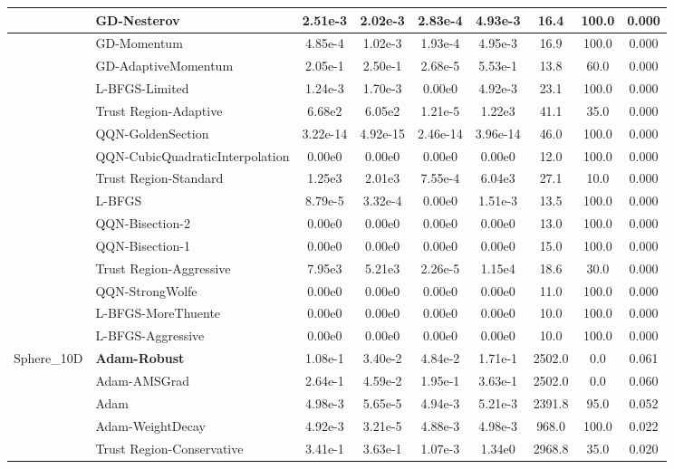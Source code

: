 \documentclass{article}
\begin{document}
\begin{longtable}{|l|l|c|c|c|c|c|c|c|}
\hline
 & GD-Nesterov & 2.51e-3 & 2.02e-3 & 2.83e-4 & 4.93e-3 & 16.4 & 100.0 & 0.000 \\
\hline
 & GD-Momentum & 4.85e-4 & 1.02e-3 & 1.93e-4 & 4.95e-3 & 16.9 & 100.0 & 0.000 \\
\hline
 & GD-AdaptiveMomentum & 2.05e-1 & 2.50e-1 & 2.68e-5 & 5.53e-1 & 13.8 & 60.0 & 0.000 \\
\hline
 & L-BFGS-Limited & 1.24e-3 & 1.70e-3 & 0.00e0 & 4.92e-3 & 23.1 & 100.0 & 0.000 \\
\hline
 & Trust Region-Adaptive & 6.68e2 & 6.05e2 & 1.21e-5 & 1.22e3 & 41.1 & 35.0 & 0.000 \\
\hline
 & QQN-GoldenSection & 3.22e-14 & 4.92e-15 & 2.46e-14 & 3.96e-14 & 46.0 & 100.0 & 0.000 \\
\hline
 & QQN-CubicQuadraticInterpolation & 0.00e0 & 0.00e0 & 0.00e0 & 0.00e0 & 12.0 & 100.0 & 0.000 \\
\hline
 & Trust Region-Standard & 1.25e3 & 2.01e3 & 7.55e-4 & 6.04e3 & 27.1 & 10.0 & 0.000 \\
\hline
 & L-BFGS & 8.79e-5 & 3.32e-4 & 0.00e0 & 1.51e-3 & 13.5 & 100.0 & 0.000 \\
\hline
 & QQN-Bisection-2 & 0.00e0 & 0.00e0 & 0.00e0 & 0.00e0 & 13.0 & 100.0 & 0.000 \\
\hline
 & QQN-Bisection-1 & 0.00e0 & 0.00e0 & 0.00e0 & 0.00e0 & 15.0 & 100.0 & 0.000 \\
\hline
 & Trust Region-Aggressive & 7.95e3 & 5.21e3 & 2.26e-5 & 1.15e4 & 18.6 & 30.0 & 0.000 \\
\hline
 & QQN-StrongWolfe & 0.00e0 & 0.00e0 & 0.00e0 & 0.00e0 & 11.0 & 100.0 & 0.000 \\
\hline
 & L-BFGS-MoreThuente & 0.00e0 & 0.00e0 & 0.00e0 & 0.00e0 & 10.0 & 100.0 & 0.000 \\
\hline
 & L-BFGS-Aggressive & 0.00e0 & 0.00e0 & 0.00e0 & 0.00e0 & 10.0 & 100.0 & 0.000 \\
Sphere\_10D & \textbf{Adam-Robust} & 1.08e-1 & 3.40e-2 & 4.84e-2 & 1.71e-1 & 2502.0 & 0.0 & 0.061 \\
\hline
 & Adam-AMSGrad & 2.64e-1 & 4.59e-2 & 1.95e-1 & 3.63e-1 & 2502.0 & 0.0 & 0.060 \\
\hline
 & Adam & 4.98e-3 & 5.65e-5 & 4.94e-3 & 5.21e-3 & 2391.8 & 95.0 & 0.052 \\
\hline
 & Adam-WeightDecay & 4.92e-3 & 3.21e-5 & 4.88e-3 & 4.98e-3 & 968.0 & 100.0 & 0.022 \\
\hline
 & Trust Region-Conservative & 3.41e-1 & 3.63e-1 & 1.07e-3 & 1.34e0 & 2968.8 & 35.0 & 0.020 \\

\end{longtable}
\end{document}
